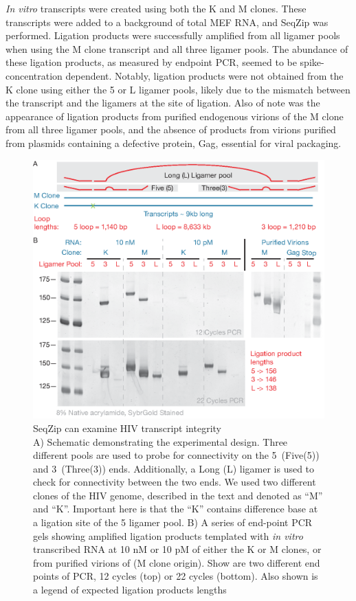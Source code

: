    \textit{In vitro} transcripts were created using both the K and M clones. These transcripts were added to a background of total MEF RNA, and SeqZip was performed. Ligation products were successfully amplified from all ligamer pools when using the M clone transcript and all three ligamer pools. The abundance of these ligation products, as measured by endpoint PCR, seemed to be spike-concentration dependent. Notably, ligation products were not obtained from the K clone using either the 5 or L ligamer pools, likely due to the mismatch between the transcript and the ligamers at the site of ligation. Also of note was the appearance of ligation products from purified endogenous virions of the M clone from all three ligamer pools, and the absence of products from virions purified from plasmids containing a defective protein, Gag, essential for viral packaging. 

	  \begin{figure} %
  	  \centering 
	    \includegraphics{Figures/SeqZipMethod/HIVviaSeqZip.eps}
    	\caption[SeqZip can examine HIV transcript integrity]
    	{
	      SeqZip can examine HIV transcript integrity\\[0.25cm]
      	A) Schematic demonstrating the experimental design. Three different pools are used to probe for connectivity on the 5\textprime~(Five(5)) and 3\textprime~(Three(3)) ends. Additionally, a Long (L) ligamer is used to check for connectivity between the two ends. We used two different clones of the HIV genome, described in the text and denoted as ``M'' and ``K''. Important here is that the ``K'' contains difference base at a ligation site of the 5 ligamer pool.
        B) A series of end-point PCR gels showing amplified ligation products templated with \textit{in vitro} transcribed RNA at 10 nM or 10 pM of either the K or M clones, or from purified virions of (M clone origin). Show are two different end points of PCR, 12 cycles (top) or 22 cycles (bottom). Also shown is a legend of expected ligation products lengths
    		}
    	\label{SeqZipMethod:fig:Hiv tx via SeqZip}
  		\end{figure}

